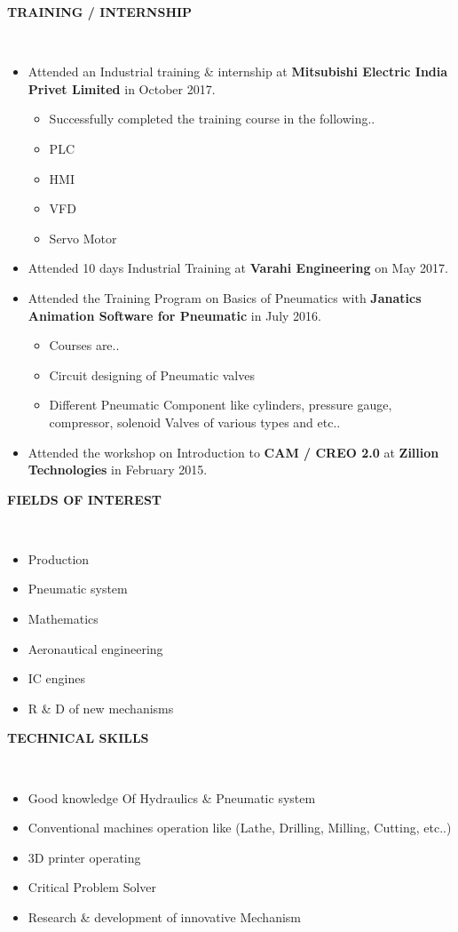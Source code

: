 \documentclass[a4paper,10pt]{article}
\newcommand{\lsep}{-0.5cm}
\newcommand{\resheading}[1]{{\small \colorbox{mygrey}{\begin{minipage}{0.975\textwidth}{\textbf{#1 \vphantom{p\^{E}}}}\end{minipage}}}}
\begin{document}
\resheading{\textbf{TRAINING / INTERNSHIP} }\\[\lsep]
\begin{itemize}
    \item \noindent Attended an Industrial training \& internship at   \textbf{ Mitsubishi Electric India Privet Limited } in October  2017.\\
        \begin{itemize}
        \item Successfully completed the training course in the following..
        \item PLC
        \item HMI
        \item VFD 
        \item Servo Motor
        \end{itemize}
    \item \noindent Attended 10 days Industrial Training at \textbf{ Varahi Engineering} on May 2017.
    \item \noindent Attended the Training Program on Basics of Pneumatics with \textbf{ Janatics Animation Software for Pneumatic } in July 2016.
        \begin{itemize}
        \item Courses are..
        \item Circuit designing of Pneumatic valves 
        \item Different Pneumatic Component like cylinders, pressure gauge, compressor, solenoid Valves of various types and etc..
        \end{itemize}
    \item \noindent Attended the workshop on Introduction to \textbf{CAM / CREO 2.0} at \textbf{ Zillion Technologies } in February 2015. 
\end{itemize}


\resheading{\textbf{FIELDS OF INTEREST} }\\[\lsep]
\begin{itemize}
\item \noindent Production
\item \noindent Pneumatic system
\item \noindent Mathematics
\item \noindent Aeronautical engineering
\item \noindent IC engines 
\item \noindent R \& D of new mechanisms   \end{itemize}

\resheading{\textbf{TECHNICAL SKILLS} }\\[\lsep]
\begin{itemize}
\item \noindent Good knowledge Of Hydraulics \& Pneumatic system
\item \noindent Conventional machines operation like (Lathe, Drilling, Milling, Cutting, etc..)   
\item \noindent 3D printer operating 
\item \noindent Critical Problem Solver 
\item \noindent Research \& development of innovative Mechanism
\end{itemize}
\end{document}
